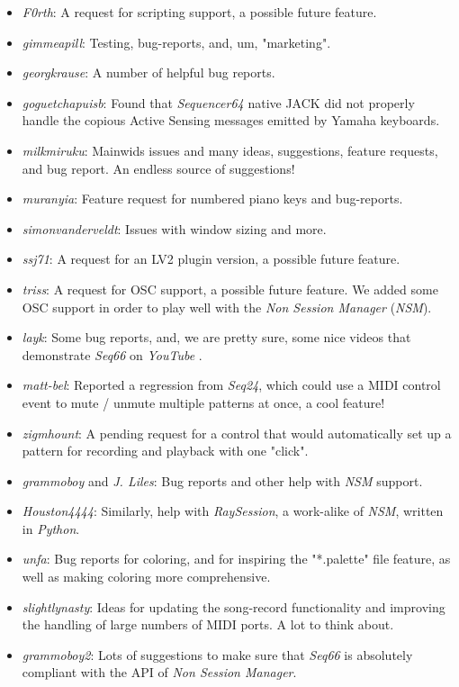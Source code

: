   \begin{itemize}
      \item \textsl{F0rth}:
         A request for scripting support, a possible future feature.
      \item \textsl{gimmeapill}:
         Testing, bug-reports, and, um, "marketing".
      \item \textsl{georgkrause}:
         A number of helpful bug reports.
      \item \textsl{goguetchapuisb}:
         Found that \textsl{Sequencer64} native JACK did not properly handle
         the copious Active Sensing messages emitted by Yamaha keyboards.
      \item \textsl{milkmiruku}:
         Mainwids issues and many ideas, suggestions, feature requests, and bug
         report.  An endless source of suggestions!
      \item \textsl{muranyia}:
         Feature request for numbered piano keys and bug-reports.
      \item \textsl{simonvanderveldt}:
         Issues with window sizing and more.
      \item \textsl{ssj71}:
         A request for an LV2 plugin version, a possible future feature.
      \item \textsl{triss}:
         A request for OSC support, a possible future feature.  We added some
         OSC support in order to play well with the \textsl{Non Session
         Manager} (\textsl{NSM}).
      \item \textsl{layk}:
         Some bug reports, and, we are pretty sure, some nice videos that
         demonstrate \textsl{Seq66} on \textsl{YouTube} \cite{layk}.
      \item \textsl{matt-bel}:
         Reported a regression from \textsl{Seq24}, which could use
         a MIDI control event to mute / unmute multiple patterns at once,
         a cool feature!
      \item \textsl{zigmhount}:
         A pending request for a control that would automatically set up a
         pattern for recording and playback with one "click".
      \item \textsl{grammoboy} and \textsl{J. Liles}:
         Bug reports and other help with \textsl{NSM} support.
      \item \textsl{Houston4444}:
         Similarly, help with \textsl{RaySession}, a work-alike of
         \textsl{NSM}, written in \textsl{Python}.
      \item \textsl{unfa}:
         Bug reports for coloring, and for inspiring the "*.palette" file
         feature, as well as making coloring more comprehensive.
      \item \textsl{slightlynasty}:
         Ideas for updating the song-record functionality and improving the
         handling of large numbers of MIDI ports.
         A lot to think about.
      \item \textsl{grammoboy2}:
         Lots of suggestions to make sure that \textsl{Seq66} is absolutely
         compliant with the API of \textsl{Non Session Manager}.
   \end{itemize}

